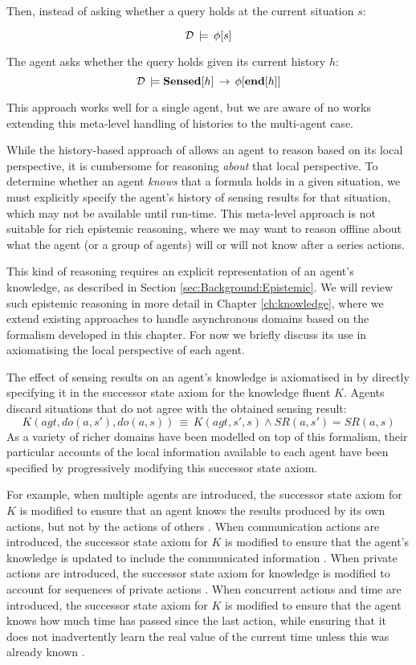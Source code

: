 Then, instead of asking whether a query holds at the current situation
$s$:

\[
\mathcal{D}\,\models\,\phi[s]\]


The agent asks whether the query holds given its current history $h$:\[
\mathcal{D}\,\models\mathbf{Sensed}[h]\,\rightarrow\,\phi[\mathbf{end}[h]]\]


This approach works well for a single agent, but we are aware of no
works extending this meta-level handling of histories to the multi-agent
case.

While the history-based approach of \citep{giacomo99indigolog} allows
an agent to reason based on its local perspective, it is cumbersome
for reasoning \emph{about} that local perspective. To determine whether
an agent \emph{knows} that a formula holds in a given situation, we
must explicitly specify the agent's history of sensing results for
that situation, which may not be available until run-time. This meta-level
approach is not suitable for rich epistemic reasoning, where we may
want to reason offline about what the agent (or a group of agents)
will or will not know after a series actions.

This kind of reasoning requires an explicit representation of an agent's
knowledge, as described in Section \ref{sec:Background:Epistemic}.
We will review such epistemic reasoning in more detail in Chapter
\ref{ch:knowledge}, where we extend existing approaches to handle
asynchronous domains based on the formalism developed in this chapter.
For now we briefly discuss its use in axiomatising the local perspective
of each agent.

The effect of sensing results on an agent's knowledge is axiomatised
in \citep{scherl03sc_knowledge} by directly specifying it in the
successor state axiom for the knowledge fluent $K$. Agents discard
situations that do not agree with the obtained sensing result:\[
K(agt,do(a,s'),do(a,s))\,\equiv\, K(agt,s',s)\wedge SR(a,s')=SR(a,s)\]
 As a variety of richer domains have been modelled on top of this
formalism, their particular accounts of the local information available
to each agent have been specified by progressively modifying this
successor state axiom.

For example, when multiple agents are introduced, the successor state
axiom for $K$ is modified to ensure that an agent knows the results
produced by its own actions, but not by the actions of others \citep{shapiro98specifying_ma_systems}.
When communication actions are introduced, the successor state axiom
for $K$ is modified to ensure that the agent's knowledge is updated
to include the communicated information \citep{shapiro01casl_feat_inter,shapiro07sc_goal_change}.
When private actions are introduced, the successor state axiom for
knowledge is modified to account for sequences of private actions
\citep{Lesperance99sitcalc_approach}. When concurrent actions and
time are introduced, the successor state axiom for $K$ is modified
to ensure that the agent knows how much time has passed since the
last action, while ensuring that it does not inadvertently learn the
real value of the current time unless this was already known \citep{scherl03conc_knowledge}.


